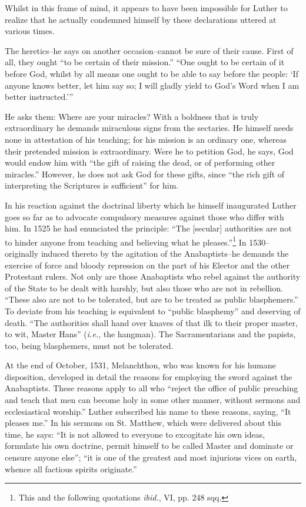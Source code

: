 Whilst in this frame of mind, it appears to have been impossible for
Luther to realize that he actually condemned himself by these declarations
uttered at various times.

The heretics--he says on another occasion--cannot be sure of their cause.
First of all, they ought “to be certain of their mission.” “One ought to be
certain of it before God, whilst by all means one ought to be able to say
before the people: ‘If anyone knows better, let him say so; I will gladly
yield to God’s Word when I am better instructed.’”

He asks them: Where are your miracles? With a boldness that is truly
extraordinary he demands miraculous signs from the sectaries. He himself
needs none in attestation of his teaching; for his mission is an ordinary one,
whereas their pretended mission is extraordinary. Were he to petition God,
he says, God would endow him with “the gift of raising the dead, or of
performing other miracles.” However, he does not ask God for these gifts,
since “the rich gift of interpreting the Scriptures is sufficient” for him.

In his reaction against the doctrinal liberty which he himself inaugurated
Luther goes so far as to advocate compulsory measures against
those who differ with him. In 1525 he had enunciated the principle:
“The [secular] authorities are not to hinder anyone from teaching
and believing what he pleases.”\footnote{This and the following quotations \textit{ibid.}, VI, pp. 248 sqq.}
In 1530--originally induced thereto
by the agitation of the Anabaptists--he demands the exercise of force
and bloody repression on the part of his Elector and the other
Protestant rulers. Not only are those Anabaptists who rebel against
the authority of the State to be dealt with harshly, but also those who
are not in rebellion. “These also are not to be tolerated, but are to
be treated as public blasphemers.” To deviate from his teaching is
equivalent to “public blasphemy” and deserving of death. “The authorities
shall hand over knaves of that ilk to their proper master, to
wit, Master Hans” (\textit{i.e.}, the hangman). The Sacramentarians and the
papists, too, being blasphemers, must not be tolerated.

At the end of October, 1531, Melanchthon, who was known for his
humane disposition, developed in detail the reasons for employing the
sword against the Anabaptists. These reasons apply to all who “reject
the office of public preaching and teach that men can become holy
in some other manner, without sermons and ecclesiastical worship.”
Luther subscribed his name to these reasons, saying, “It pleases me.”
In his sermons on St. Matthew, which were delivered about this time,
he says: “It is not allowed to everyone to excogitate his own ideas,
formulate his own doctrine, permit himself to be called Master and
dominate or censure anyone else”; “it is one of the greatest and most
injurious vices on earth, whence all factious spirits originate.”

